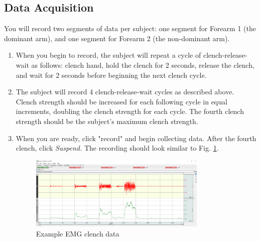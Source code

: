 \documentclass{article}
\begin{document}
\subsection*{Data Acquisition}
You will record two segments of data per subject: one segment for Forearm 1 (the dominant arm), and one segment for Forearm 2 (the non-dominant arm).
\begin{enumerate}
	\item When you begin to record, the subject will repeat a cycle of clench-release-wait as follows: clench hand, hold the clench for 2 seconds, release the clench, and wait for 2 seconds before beginning the next clench cycle.
	\item The subject will record 4 clench-release-wait cycles as described above. Clench strength should be increased for each following cycle in equal increments, doubling the clench strength for each cycle. The fourth clench strength should be the subject's maximum clench strength.
	\item When you are ready, click "record" and begin collecting data. After the fourth clench, click \textit{Suspend.} The recording should look similar to Fig. \ref{clench}.
		\begin{figure}[h]
	\includegraphics[width=0.8\textwidth]{../images/EMG_I_14.png}	
		\centering
		\caption{Example EMG clench data}
		\label{clench}
		\end{figure}


\end{enumerate}
\end{document}
